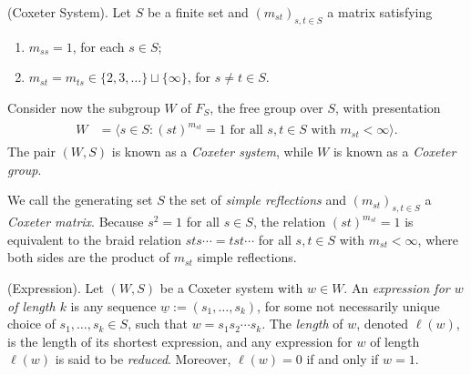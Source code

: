 \noindent\begin{definition}\textup{(Coxeter System).} Let $S$ be a finite set and $(m_{st})_{s,t \in S}$ a matrix satisfying
\begin{enumerate}[label=$\bullet$, leftmargin=4\parindent]
\item $m_{ss} = 1$, for each $s \in S$;
\item $m_{st} = m_{ts} \in \{2, 3, \dots\} \sqcup \{\infty\}$, for $s \neq t \in S$.
\end{enumerate}
\noindent Consider now the subgroup $W$ of $F_S$, the free group over $S$, with presentation
\begin{align*}
\begin{split}
W &= \langle s \in S : \text{$(st)^{m_{st}} = 1$ for all $s, t \in S$ with $m_{st} < \infty$}\rangle.%
\end{split}
\end{align*}
\noindent The pair $(W, S)$ is known as a {\em Coxeter system}, while $W$ %
is known as a {\em Coxeter group}.\\
\end{definition}

\noindent We call the generating set $S$ the set of {\em simple reflections} and $(m_{st})_{s,t \in S}$ a {\em Coxeter matrix}. Because $s^2 = 1$ for all $s \in S$, the relation $(st)^{m_{st}} = 1$ is equivalent to the braid relation $sts\cdots = tst\cdots$ for all $s, t \in S$ with $m_{st} < \infty$, where both sides are the product of $m_{st}$ simple reflections.\\

\noindent\begin{definition}\textup{(Expression).} Let $(W, S)$ be a Coxeter system with $w \in W$. An {\em expression for $w$ of length $k$} is any sequence $\underline{w} := (s_1, \dots, s_k)$, for some not necessarily unique choice of $s_1, \dots, s_k \in S$, such that $w = s_1 s_2 \cdots s_k$. The {\em length} of $w$, denoted $\ell(w)$, is the length of its shortest expression, and any expression for $w$ of length $\ell(w)$ is said to be {\em reduced}. Moreover, $\ell(w) = 0$ if and only if $w = 1$.\\
\end{definition}

